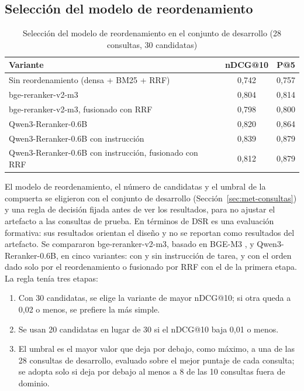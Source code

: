 \subsection{Selección del modelo de reordenamiento}

\begin{table}[!htb]
    \centering
    \caption{Selección del modelo de reordenamiento en el conjunto de desarrollo (28 consultas, 30 candidatas)}
    \label{tab:art-rerank-dev}
    \small
    \begin{tabular}{|l|c|c|}
        \hline
        \textbf{Variante} & \textbf{nDCG@10} & \textbf{P@5} \\
        \hline
        Sin reordenamiento (densa + BM25 + RRF) & 0{,}742 & 0{,}757 \\
        \hline
        bge-reranker-v2-m3 & 0{,}804 & 0{,}814 \\
        \hline
        bge-reranker-v2-m3, fusionado con RRF & 0{,}798 & 0{,}800 \\
        \hline
        Qwen3-Reranker-0.6B & 0{,}820 & 0{,}864 \\
        \hline
        Qwen3-Reranker-0.6B con instrucción & 0{,}839 & 0{,}879 \\
        \hline
        Qwen3-Reranker-0.6B con instrucción, fusionado con RRF & 0{,}812 & 0{,}879 \\
        \hline
    \end{tabular}
\end{table}

El modelo de reordenamiento, el número de candidatas y el umbral de la compuerta se eligieron con el conjunto de desarrollo (Sección~\ref{sec:met-consultas}) y una regla de decisión fijada antes de ver los resultados, para no ajustar el artefacto a las consultas de prueba. En términos de DSR es una evaluación formativa: sus resultados orientan el diseño y no se reportan como resultados del artefacto. Se compararon bge-reranker-v2-m3, basado en BGE-M3 \citep{Chen2024M3}, y Qwen3-Reranker-0.6B, en cinco variantes: con y sin instrucción de tarea, y con el orden dado solo por el reordenamiento o fusionado por RRF con el de la primera etapa. La regla tenía tres etapas:
\begin{enumerate}
    \item Con 30 candidatas, se elige la variante de mayor nDCG@10; si otra queda a 0,02 o menos, se prefiere la más simple.
    \item Se usan 20 candidatas en lugar de 30 si el nDCG@10 baja 0,01 o menos.
    \item El umbral es el mayor valor que deja por debajo, como máximo, a una de las 28 consultas de desarrollo, evaluado sobre el mejor puntaje de cada consulta; se adopta solo si deja por debajo al menos a 8 de las 10 consultas fuera de dominio.
\end{enumerate}



